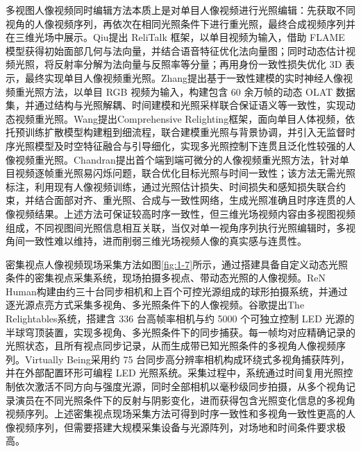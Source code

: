 多视图人像视频同时编辑方法本质上是对单目人像视频进行光照编辑：先获取不同视角的人像视频序列，再依次在相同光照条件下进行重光照，最终合成视频序列并在三维光场中展示。Qiu\cite{Qiu2024}提出 ReliTalk 框架，以单目视频为输入，借助 FLAME 模型获得初始面部几何与法向量，并结合语音特征优化法向量图；同时动态估计视频光照，将反射率分解为法向量与反照率等分量；再用身份一致性损失优化 3D 表示，最终实现单目人像视频重光照。Zhang提出基于一致性建模的实时神经人像视频重光照方法\cite{Zhang2021b}，以单目 RGB 视频为输入，构建包含 60 余万帧的动态 OLAT 数据集，并通过结构与光照解耦、时间建模和光照采样联合保证语义等一致性，实现动态视频重光照。Wang提出Comprehensive Relighting\cite{Wang2025}框架，面向单目人体视频，依托预训练扩散模型构建粗到细流程，联合建模重光照与背景协调，并引入无监督时序光照模型及时空特征融合与引导细化，实现多光照控制下连贯且泛化性较强的人像视频重光照。Chandran提出首个端到端可微分的人像视频重光照\cite{Chandran2022}方法，针对单目视频逐帧重光照易闪烁问题，联合优化目标光照与时间一致性；该方法无需光照标注，利用现有人像视频训练，通过光照估计损失、时间损失和感知损失联合约束，并结合面部对齐、重光照、合成与一致性网络，生成光照准确且时序连贯的人像视频结果。上述方法可保证较高时序一致性，但三维光场视频内容由多视图视频组成，不同视图间光照信息相互关联，当仅对单一视角序列执行光照编辑时，多视角间一致性难以维持，进而削弱三维光场视频人像的真实感与连贯性。

密集视点人像视频现场采集方法如图\ref{fig:1-7}所示，通过搭建具备自定义动态光照条件的密集视点采集系统，现场拍摄多视点、带动态光照的人像视频。ReN Human\cite{Xie2024}构建由约三十台同步相机和上百个可控光源组成的球形拍摄系统，并通过逐光源点亮方式采集多视角、多光照条件下的人像视频。谷歌提出The Relightables\cite{Guo2019}系统，搭建含 336 台高帧率相机与约 5000 个可独立控制 LED 光源的半球穹顶装置，实现多视角、多光照条件下的同步捕获。每一帧均对应精确记录的光照状态，且所有视点同步记录，从而生成带已知光照条件的多视角人像视频序列。Virtually Being\cite{Xu2025}采用约 75 台同步高分辨率相机构成环绕式多视角捕获阵列，并在外部配置环形可编程 LED 光照系统。采集过程中，系统通过时间复用光照控制依次激活不同方向与强度光源，同时全部相机以毫秒级同步拍摄，从多个视角记录演员在不同光照条件下的反射与阴影变化，进而获得包含光照变化信息的多视角视频序列。上述密集视点现场采集方法可得到时序一致性和多视角一致性更高的人像视频序列，但需要搭建大规模采集设备与光源阵列，对场地和时间条件要求极高。

